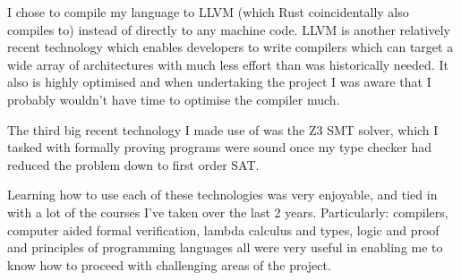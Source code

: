 I chose to compile my language to LLVM (which Rust coincidentally also compiles to) instead of
directly to any machine code.
LLVM is another relatively recent technology which enables developers to write compilers which can
target a wide array of architectures with much less effort than was historically needed.
It also is highly optimised and when undertaking the project I was aware that I probably wouldn't
have time to optimise the compiler much.

The third big recent technology I made use of was the Z3 SMT solver, which I tasked with formally
proving programs were sound once my type checker had reduced the problem down to first order SAT.

Learning how to use each of these technologies was very enjoyable, and tied in with a lot of the
courses I've taken over the last 2 years.
Particularly: compilers, computer aided formal verification, lambda calculus and types, logic and proof
and principles of programming languages all were very useful in enabling me to know how to proceed
with challenging areas of the project.
